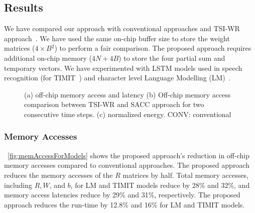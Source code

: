 \documentclass[a4paper,10pt]{article}
\begin{document}
\subsection{Results}
We have compared our approach with conventional approaches and TSI-WR approach~\cite{park2020time}. We have used the same on-chip buffer size to store the weight matrices ($4{\times}B{^2}$) to perform a fair comparison. The proposed approach requires additional on-chip memory ($4N{+}4B$) to store the four partial sum and temporary vectors.
We have experimented with LSTM models used in speech recognition (for TIMIT~\cite{garofolo1993timit}) and character level Language Modelling (LM)~\cite{sundermeyer2015feedforward}.
\begin{figure}[!htb]
	\centering
	\hfil
	\caption{(a) off-chip memory access and latency (b) Off-chip memory access comparison between TSI-WR and SACC approach for two consecutive time steps. (c) normalized energy. CONV: conventional}	\label{fig:compareMemAccessAndRunTime}
	\vspace{-1.0em}	
\end{figure}
\subsubsection{Memory Accesses}
\figurename{~\ref{fig:memAccessForModels}} shows the proposed approach's reduction in off-chip memory accesses compared to conventional approaches. The proposed approach reduces the memory accesses of the $R$ matrices by half. Total memory accesses, including $R, W$, and $b$, for LM and TIMIT models reduce by 28\% and 32\%, and memory access latencies reduce by 29\% and 31\%, respectively.
The proposed approach reduces the run-time by 12.8\% and 16\% for LM and TIMIT models. 
\end{document}
